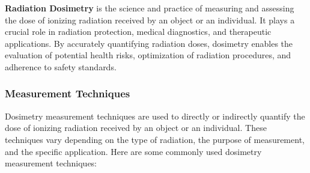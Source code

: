 \documentclass[../../Report.tex]{subfiles}
\begin{document}
    \textbf{Radiation Dosimetry} \cite{b4} is the science and practice of measuring and assessing the dose of ionizing 
    radiation received by an object or an individual. It plays a crucial role in radiation protection, medical 
    diagnostics, and therapeutic applications. By accurately quantifying radiation doses, dosimetry enables the 
    evaluation of potential health risks, optimization of radiation procedures, and adherence to safety standards.

    \subsubsection*{\large Measurement Techniques}
        Dosimetry measurement techniques\cite{b6} are used to directly or indirectly quantify the dose of ionizing radiation 
        received by an object or an individual. These techniques vary depending on the type of radiation, the purpose 
        of measurement, and the specific application. Here are some commonly used dosimetry measurement techniques:
\end{document}
